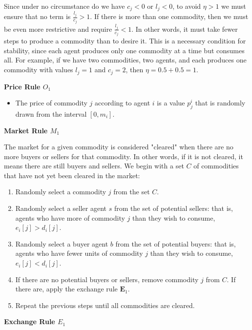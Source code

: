 Since under no circumstance do we have $c_{j}<0$ or $l_{j}<0$, to avoid $\eta>1$ we must ensure that no term is $\frac{l_{j}}{c_{j}}>1$.  If there is more than one commodity, then we must be even more restrictive and require $\frac{l_{j}}{c_{j}}<1$.
In other words, it must take fewer steps to produce a commodity than to desire it.  This is a necessary condition for stability, since each agent produces only one commodity at a time but consumes all.  For example, if we have two commodities, two agents, and each produces one commodity with values $l_{j}=1$ and $c_{j}=2$,  then $\eta=0.5+0.5=1$.  


\textbf{Price Rule $O_{1}$}

\begin{itemize}
    \item The price of commodity $j$ according to agent $i$ is a value $p_{j}^{i}$  
  that is randomly drawn from the interval $\left[0,m_{i}\right]$.
\end{itemize}


 \textbf{Market Rule $M_{1}$}

The market for a given commodity is considered "cleared" when there are no more buyers or sellers for that commodity.  In other words, if it is not cleared, it means there are still buyers and sellers.  We begin with a set $C$ of commodities that have not yet been cleared in the market:
\begin{enumerate}
    \item  Randomly select a commodity $j$ from the set $C$.

\item Randomly select a seller agent $s$ from the set of potential sellers:     that is, agents who have more of commodity $j$ than they wish to consume, $e_{i}[j]>d_{i}[j]$.

\item Randomly select a buyer agent $b$ from the set of potential buyers:     that is, agents who have fewer units of commodity $j$ than they wish to consume, $e_{i}[j]<d_{i}[j]$.

\item If there are no potential buyers or sellers, remove commodity $j$ from $C$.     If there are, apply the exchange rule $\boldsymbol{E}_{1}$.

\item Repeat the previous steps until all commodities are cleared.
\end{enumerate}


\textbf{Exchange Rule $E_{1}$}

